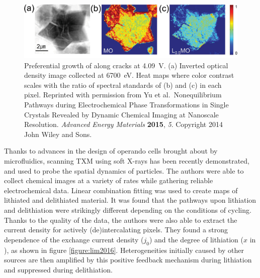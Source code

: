 \documentclass[journal=cmatex,manuscript=perspective]{achemso}
\begin{document}
\begin{figure}
  \includegraphics[width=\textwidth]{yu2015}
  \caption{Preferential growth of  along cracks at
    \SI{4.09}{V}. (a) Inverted optical density image collected at
    \SI{6700}{eV}. Heat maps where color contrast scales with the
    ratio of spectral standards of (b)  and (c)
     in each pixel. Reprinted with permission from
    Yu et al.\ Nonequilibrium Pathways during Electrochemical Phase
    Transformations in Single Crystals Revealed by Dynamic Chemical
    Imaging at Nanoscale Resolution. \textit{Advanced Energy
      Materials} \textbf{2015}, \textit{5}. Copyright 2014 John Wiley
    and Sons.}
  \label{figure:yu2015}
\end{figure}

Thanks to advances in the design of operando cells brought about by
microfluidics, scanning TXM using soft X-rays has been recently
demonstrated, and used to probe the spatial dynamics of 
particles\cite{lim2016}. The authors were able to collect chemical
images at a variety of rates while gathering reliable electrochemical
data. Linear combination fitting was used to create maps of lithiated
and delithiated material. It was found that the pathways upon
lithiation and delithiation were strikingly different depending on the
conditions of cycling. Thanks to the quality of the data, the authors
were also able to extract the current density for actively
(de)intercalating pixels. They found a strong dependence of the
exchange current density ($j_0$) and the degree of lithiation ($x$ in
), as shown in figure
\ref{figure:lim2016}. Heterogeneities initially caused by other
sources are then amplified by this positive feedback mechanism during
lithiation and suppressed during delithiation.
\end{document}
